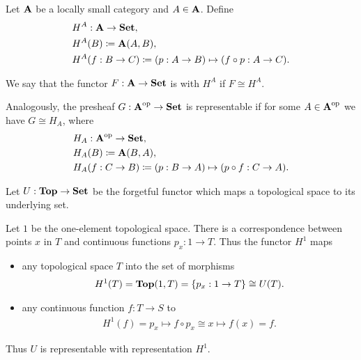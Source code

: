 \begin{definition}\label{def:representable_functor}\cite[definitions 4.1.3, 4.1.16]{Leinster2014}
  Let $\operatorname{\mathbf{A}}$ be a locally small category and $A \in \operatorname{\mathbf{A}}$. Define
  \begin{align*}
    &H^A: \operatorname{\mathbf{A}} \to \operatorname{\mathbf{Set}}, \\
    &H^A(B) \coloneqq \operatorname{\mathbf{A}}(A, B), \\
    &H^A(f: B \to C) \coloneqq (p: A \to B) \mapsto (f \circ p: A \to C).
  \end{align*}

  We say that the functor $F: \operatorname{\mathbf{A}} \to \operatorname{\mathbf{Set}}$ is  with  $H^A$ if $F \cong H^A$.

  Analogously, the presheaf $G: \operatorname{\mathbf{A}}^{\operatorname{op}} \to \operatorname{\mathbf{Set}}$ is representable if for some $A \in \operatorname{\mathbf{A}}^{\operatorname{op}}$ we have $G \cong H_A$, where
  \begin{align*}
    &H_A: \operatorname{\mathbf{A}}^{\operatorname{op}} \to \operatorname{\mathbf{Set}}, \\
    &H_A(B) \coloneqq \operatorname{\mathbf{A}}(B, A), \\
    &H_A(f: C \to B) \coloneqq (p: B \to A) \mapsto (p \circ f: C \to A).
  \end{align*}
\end{definition}

\begin{example}\label{def:top_representable_functor}\cite[example 4.1.4]{Leinster2014}
  Let $U: \operatorname{\mathbf{Top}} \to \operatorname{\mathbf{Set}}$ be the forgetful functor which maps a topological space to its underlying set.

  Let $1$ be the one-element topological space. There is a correspondence between points $x$ in $T$ and continuous functions $p_x: 1 \to T$. Thus the functor $H^1$ maps
  \begin{itemize}
    \item any topological space $T$ into the set of morphisms
    \begin{align*}
      H^1(T) = \operatorname{\mathbf{Top}}(1, T) = \{ p_x: 1 \to T \} \cong U(T).
    \end{align*}
    \item any continuous function $f: T \to S$ to
    \begin{align*}
      H^1(f) = p_x \mapsto f \circ p_x \cong x \mapsto f(x) = f.
    \end{align*}
  \end{itemize}

  Thus $U$ is representable with representation $H^1$.
\end{example}

